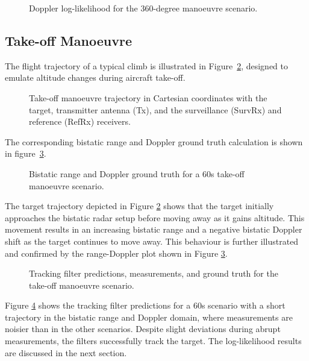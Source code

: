 \begin{figure}[H]
    \centering
    
    \caption{Doppler log-likelihood for the 360-degree manoeuvre scenario.}
    \label{fig:dopplerLogLike360}
\end{figure}

\subsection{Take-off Manoeuvre}
The flight trajectory of a typical climb is illustrated in Figure~\ref{fig:takeoff3D}, designed to emulate altitude changes during aircraft take-off. 

\begin{figure}[H]
    \centering
    
    \caption{Take-off manoeuvre trajectory in Cartesian coordinates with the target, transmitter antenna (Tx), and the surveillance (SurvRx) and reference (RefRx) receivers.}
    \label{fig:takeoff3D}
\end{figure}

The corresponding bistatic range and Doppler ground truth calculation is shown in figure~\ref{fig:takoffRangeDoppler}.

\begin{figure}[H]
    \centering
    
    \caption{Bistatic range and Doppler ground truth for a 60s take-off manoeuvre scenario.}
    \label{fig:takoffRangeDoppler}
\end{figure}

The target trajectory depicted in Figure \ref{fig:takeoff3D} shows that the target initially approaches the bistatic radar setup before moving away as it gains altitude. This movement results in an increasing bistatic range and a negative bistatic Doppler shift as the target continues to move away. This behaviour is further illustrated and confirmed by the range-Doppler plot shown in Figure \ref{fig:takoffRangeDoppler}.

\begin{figure}[H]
    \centering
    
    \caption{Tracking filter predictions, measurements, and ground truth for the take-off manoeuvre scenario.}
    \label{fig:takeoffOutputs}
\end{figure}
Figure \ref{fig:takeoffOutputs} shows the tracking filter predictions for a 60s scenario with a short trajectory in the bistatic range and Doppler domain, where measurements are noisier than in the other scenarios. Despite slight deviations during abrupt measurements, the filters successfully track the target. The log-likelihood results are discussed in the next section.

